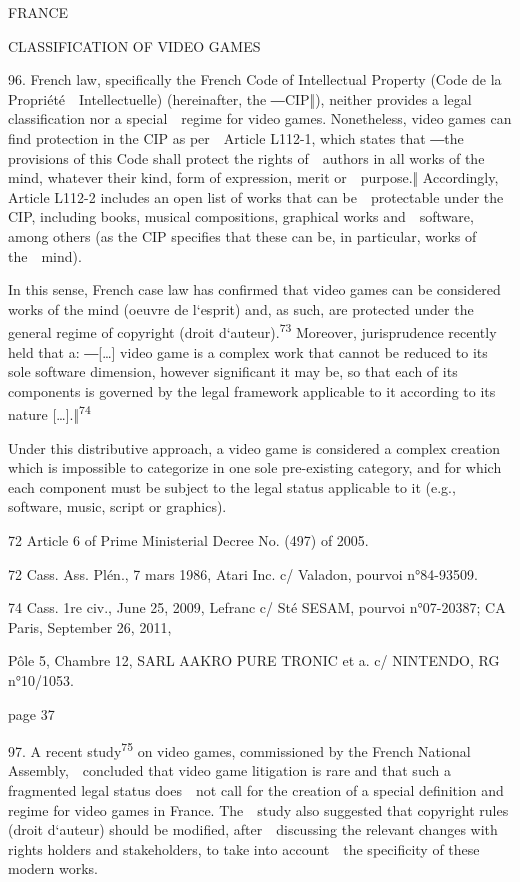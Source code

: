 \documentclass[
]{article}
\begin{document}
{FRANCE}

{CLASSIFICATION OF VIDEO GAMES}

{96. }{French law, specifically the }{French Code of Intellectual
Property }{(}{Code de la Propriété~~Intellectuelle}{) (hereinafter, the
―}{CIP}{‖), neither provides a }{legal classification nor a
special~~regime for video games. Nonetheless, video games can find
protection in the }{CIP }{as per~~Article L112-}{1, which states that
―}{the provisions of this Code shall protect the rights of~~authors in
all works of the mind, whatever their kind, form of expression, merit
or~~purpose.}{‖ Accordingly, Article L112}{-2 includes an open list of
works that can be~~protectable under the }{CIP}{, including books,
musical compositions, graphical works and~~software, among others (as
the }{CIP }{specifies that these can be, }{in particular}{, works of
the~~mind).}

{In this sense, French case law has confirmed that video games can be
considered works of the mind (}{oeuvre de l`esprit}{) and, as such, are
protected under the general regime of copyright (}{droit
d`auteur}{).}\textsuperscript{{73 }}{Moreover, jurisprudence recently
held that a: ―}{{[}\ldots{]} video game }{is a complex work that cannot
be reduced to its sole software dimension, however significant it may
be, so that each of its components is governed by the legal framework
applicable to it accord}{ing to its nature
{[}\ldots{]}.}{‖}\textsuperscript{{74}}

{Under this distributive approach, a video game is considered a complex
creation which is impossible to categorize in one sole pre-existing
category, and for which each component must be subject to the legal
status applicable to it (e.g., software, music, script or graphics).}

{72 }{Article 6 of Prime Ministerial Decree No. (497) of 2005.}

{72 }{Cass. Ass. Plén., 7 mars 1986, }{Atari Inc. c/ Valadon}{, pourvoi
n°84-93509.}

{74 }{Cass. 1re civ., June 25, 2009, }{Lefranc c/ Sté SESAM}{, pourvoi
n°07-20387; CA Paris, September 26, 2011,}

{Pôle 5, Chambre 12, }{SARL AAKRO PURE TRONIC et a. c/ NINTENDO, }{RG
n°10/1053.}

{page 37}

{97. }{A recent study}\textsuperscript{{75 }}{on video games,
commissioned by the French National Assembly,~~concluded that video game
litigation is rare and that such a fragmented legal status does~~not
call for the creation of a special definition and regime for video games
in France. The~~study also suggested that copyright rules (}{droit
d`auteur}{) should be modified, after~~discussing the relevant changes
with rights holders and stakeholders, to take into account~~the
specificity of these modern works.}
\end{document}
